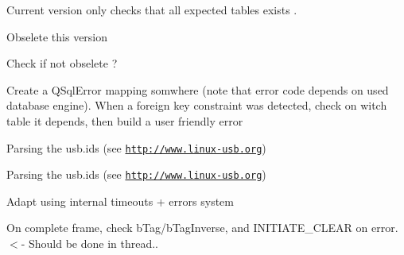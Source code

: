 \begin{DoxyRefList}
\item[\label{todo__todo000056}%
\hypertarget{todo__todo000056}{}%
Member \hyperlink{classmdt_tt_database_schema_ace92b340a68ce07ad477502a68de4514}{mdt\-Tt\-Database\-Schema\-:\-:check\-Schema} ()]Current version only checks that all expected tables exists . 
\item[\label{todo__todo000069}%
\hypertarget{todo__todo000069}{}%
Member \hyperlink{classmdt_tt_test_connection_cable_a0fcfed15264ef80fbb9e566aaf0df4e5}{mdt\-Tt\-Test\-Connection\-Cable\-:\-:add\-Link} (const Q\-Variant \&test\-Connection\-Id, const Q\-Variant \&dut\-Connection\-Id, const Q\-Variant \&test\-Cable\-Id, const Q\-Variant \&identification, const Q\-Variant \&value)]Obselete this version  
\item[\label{todo__todo000070}%
\hypertarget{todo__todo000070}{}%
Class \hyperlink{classmdt_tt_test_data}{mdt\-Tt\-Test\-Data} ]Check if not obselete ?  
\item[\label{todo__todo000073}%
\hypertarget{todo__todo000073}{}%
Member \hyperlink{classmdt_tt_test_node_unit_a9da3578291033f5f9d77f186fe2fb325}{mdt\-Tt\-Test\-Node\-Unit\-:\-:get\-Test\-Links\-Depending\-On\-Connection} (const Q\-Variant \&test\-Node\-Unit\-Connection\-Id, bool \&ok)]Create a Q\-Sql\-Error mapping somwhere (note that error code depends on used database engine). When a foreign key constraint was detected, check on witch table it depends, then build a user friendly error  
\item[\label{todo__todo000035}%
\hypertarget{todo__todo000035}{}%
Member \hyperlink{classmdt_usb_device_descriptor_a626afc71d8e72600f12259ac6f5a5866}{mdt\-Usb\-Device\-Descriptor\-:\-:product\-Name} () const ]Parsing the usb.\-ids (see \href{http://www.linux-usb.org}{\tt http\-://www.\-linux-\/usb.\-org})  
\item[\label{todo__todo000034}%
\hypertarget{todo__todo000034}{}%
Member \hyperlink{classmdt_usb_device_descriptor_ac2f746ebd5540b65bf00f82c991f5c3b}{mdt\-Usb\-Device\-Descriptor\-:\-:vendor\-Name} () const ]Parsing the usb.\-ids (see \href{http://www.linux-usb.org}{\tt http\-://www.\-linux-\/usb.\-org})  
\item[\label{todo__todo000036}%
\hypertarget{todo__todo000036}{}%
Member \hyperlink{classmdt_usb_port_manager_a34bf0ac118e586bf2547a98964a2230c}{mdt\-Usb\-Port\-Manager\-:\-:wait\-Readen\-Control\-Response} ()]Adapt using internal timeouts + errors system  
\item[\label{todo__todo000038}%
\hypertarget{todo__todo000038}{}%
Member \hyperlink{classmdt_usbtmc_port_manager_aca42b343ae1f6a324e6e45968f03bbea}{mdt\-Usbtmc\-Port\-Manager\-:\-:from\-Thread\-New\-Frame\-Readen} ()]On complete frame, check b\-Tag/b\-Tag\-Inverse, and I\-N\-I\-T\-I\-A\-T\-E\-\_\-\-C\-L\-E\-A\-R on error. $<$-\/ Should be done in thread..  

\end{DoxyRefList}
